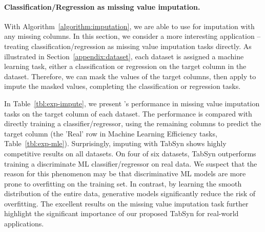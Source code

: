 \paragraph{Classification/Regression as missing value imputation.} With Algorithm~\ref{algorithm:imputation}, we are able to use \modelname for imputation with any missing columns. In this section, we consider a more interesting application -- treating classification/regression as missing value imputation tasks directly. As illustrated in Section~\ref{appendix:dataset}, each dataset is assigned a machine learning task, either a classification or regression on the target column in the dataset. Therefore, we can mask the values of the target columns, then apply \modelname to impute the masked values, completing the classification or regression tasks. 

In Table~\ref{tbl:exp-impute}, we present \modelname's performance in missing value imputation tasks on the target column of each dataset. The performance is compared with directly training a classifier/regressor, using the remaining columns to predict the target column (the 'Real' row in Machine Learning Efficiency tasks, Table~\ref{tbl:exp-mle}). Surprisingly, imputing with TabSyn shows highly competitive results on all datasets. On four of six datasets, TabSyn outperforms training a discriminate ML classifier/regressor on real data. We suspect that the reason for this phenomenon may be that discriminative ML models are more prone to overfitting on the training set. In contrast, by learning the smooth distribution of the entire data, generative models significantly reduce the risk of overfitting. The excellent results on the missing value imputation task further highlight the significant importance of our proposed TabSyn for real-world applications. 

